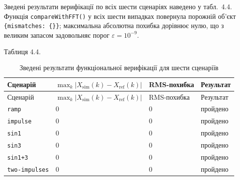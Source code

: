 \documentclass[
]{article}
\begin{document}
Зведені результати верифікації по всіх шести сценаріях наведено у
табл.~4.4. Функція \texttt{compareWithFFT}\texttt{()} у всіх шести
випадках повернула порожній об'єкт
\texttt{\{}\texttt{mismatches}\texttt{:\ \{\}\}}; максимальна абсолютна
похибка дорівнює нулю, що з великим запасом задовольняє порог
\(\varepsilon = 10^{- 9}\).

Таблиця 4.4.

\begin{longtable}[]{@{}
  >{\raggedright\arraybackslash}p{}
  >{\raggedright\arraybackslash}p{}
  >{\raggedright\arraybackslash}p{}
  >{\raggedright\arraybackslash}p{}@{}}
\caption{Зведені результати функціональної верифікації для шести
сценаріїв}\tabularnewline
\toprule\noalign{}
\begin{minipage}[b]{\linewidth}\raggedright
Сценарій
\end{minipage} & \begin{minipage}[b]{\linewidth}\raggedright
\(\max_{k}|X_{\text{sim}}(k) - X_{\text{ref}}(k)|\)
\end{minipage} & \begin{minipage}[b]{\linewidth}\raggedright
RMS-похибка
\end{minipage} & \begin{minipage}[b]{\linewidth}\raggedright
Результат
\end{minipage} \\
\midrule\noalign{}
\endfirsthead
\toprule\noalign{}
\begin{minipage}[b]{\linewidth}\raggedright
Сценарій
\end{minipage} & \begin{minipage}[b]{\linewidth}\raggedright
\(\max_{k}|X_{\text{sim}}(k) - X_{\text{ref}}(k)|\)
\end{minipage} & \begin{minipage}[b]{\linewidth}\raggedright
RMS-похибка
\end{minipage} & \begin{minipage}[b]{\linewidth}\raggedright
Результат
\end{minipage} \\
\midrule\noalign{}
\endhead
\bottomrule\noalign{}
\endlastfoot
\texttt{ramp}         & \(0\) & \(0\) & пройдено \\
\texttt{impulse}      & \(0\) & \(0\) & пройдено \\
\texttt{sin1}         & \(0\) & \(0\) & пройдено \\
\texttt{sin3}         & \(0\) & \(0\) & пройдено \\
\texttt{sin1+3}       & \(0\) & \(0\) & пройдено \\
\texttt{two-impulses} & \(0\) & \(0\) & пройдено \\
\end{longtable}
\end{document}
